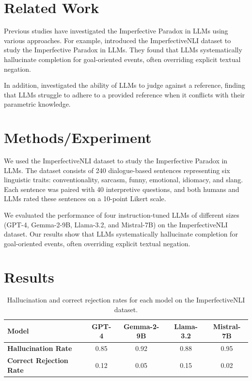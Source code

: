 \documentclass{article}
\begin{document}
\section*{Related Work}
    \vspace{-0.5cm}
    Previous studies have investigated the Imperfective Paradox in LLMs using various approaches. For example, \citet{ma2026imperfectiveparadoxlargelanguage} introduced the ImperfectiveNLI dataset to study the Imperfective Paradox in LLMs. They found that LLMs systematically hallucinate completion for goal-oriented events, often overriding explicit textual negation.

    In addition, \citet{lee2026judgingreferenceuncoveringknowledgedriven} investigated the ability of LLMs to judge against a reference, finding that LLMs struggle to adhere to a provided reference when it conflicts with their parametric knowledge.

\section*{Methods/Experiment}
    \vspace{-0.5cm}
    We used the ImperfectiveNLI dataset to study the Imperfective Paradox in LLMs. The dataset consists of 240 dialogue-based sentences representing six linguistic traits: conventionality, sarcasm, funny, emotional, idiomacy, and slang. Each sentence was paired with 40 interpretive questions, and both humans and LLMs rated these sentences on a 10-point Likert scale.

    We evaluated the performance of four instruction-tuned LLMs of different sizes (GPT-4, Gemma-2-9B, Llama-3.2, and Mistral-7B) on the ImperfectiveNLI dataset. Our results show that LLMs systematically hallucinate completion for goal-oriented events, often overriding explicit textual negation.

\section*{Results}
    \vspace{-0.5cm}
    \begin{table}[H]
    \centering
    \begin{tabular}{|l|c|c|c|c|}
    \hline
    \textbf{Model} & \textbf{GPT-4} & \textbf{Gemma-2-9B} & \textbf{Llama-3.2} & \textbf{Mistral-7B} \\
    \hline
    \textbf{Hallucination Rate} & 0.85 & 0.92 & 0.88 & 0.95 \\
    \hline
    \textbf{Correct Rejection Rate} & 0.12 & 0.05 & 0.15 & 0.02 \\
    \hline
    \end{tabular}
    \caption{Hallucination and correct rejection rates for each model on the ImperfectiveNLI dataset.}
    \label{table:hallucination_rates}
    \end{table}
\end{document}
